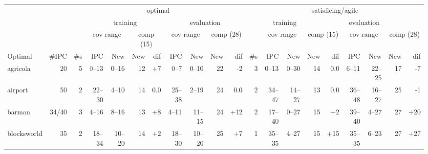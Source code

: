 \documentclass{article}
\begin{document}
                
                        \begin{table} \centering \scriptsize \setlength{\tabcolsep}{2pt}
                        \begin{tabular}{l@{}rr|rrrr|rrrr|r|rrrr|rrrr}
& & \multicolumn{9}{c}{optimal} & \multicolumn{9}{c}{satisficing/agile} \\
\cmidrule[\lightrulewidth](){3-11}
\cmidrule[\lightrulewidth](l){12-20}
& & & \multicolumn{4}{c}{training} & \multicolumn{4}{c}{evaluation} & \multicolumn{4}{c}{training} & \multicolumn{4}{c}{evaluation}\\
\cmidrule[\lightrulewidth](){4-7}
\cmidrule[\lightrulewidth](l){8-11}
\cmidrule[\lightrulewidth](){13-16}
\cmidrule[\lightrulewidth](l){17-20}
& & & \multicolumn{2}{c}{cov range} & \multicolumn{2}{c}{comp (15)} & \multicolumn{2}{c}{cov range} & \multicolumn{2}{c}{comp (28)} & & \multicolumn{2}{c}{cov range} & \multicolumn{2}{c}{comp (15)} & \multicolumn{2}{c}{cov range} & \multicolumn{2}{c}{comp (28)} \\
\cmidrule[\lightrulewidth](){4-5}
\cmidrule[\lightrulewidth](l){6-7}
\cmidrule[\lightrulewidth](l){8-9}
\cmidrule[\lightrulewidth](l){10-11}
\cmidrule[\lightrulewidth](){13-14}
\cmidrule[\lightrulewidth](l){15-16}
\cmidrule[\lightrulewidth](l){17-18}
      Optimal & \#IPC & \#s &     IPC &    New & New &              dif &     IPC &    New & New &               dif & \#s &      IPC &    New & New &               dif &      IPC &    New & New &               dif \\
\midrule
     agricola &    20 &   5 &   0--13 &  0--16 &  12 & {\color{blue}+7} &    0--7 &  0--10 &  22 &   {\color{red}-2} &   3 &    0--13 &  0--30 &  14 &               0.0 &    6--11 & 22--25 &  17 &   {\color{red}-7} \\
      airport &    50 &   2 &  22--30 &  4--10 &  14 &              0.0 &  25--38 &  2--19 &  24 &               0.0 &   2 &   34--47 & 14--27 &  13 &               0.0 &   36--48 & 16--27 &  25 &   {\color{red}-1} \\
       barman & 34/40 &   3 &   4--16 &  8--16 &  13 & {\color{blue}+8} &   4--11 & 11--15 &  24 & {\color{blue}+12} &   2 &   17--40 &  0--27 &  15 &  {\color{blue}+2} &   39--40 &  4--27 &  27 & {\color{blue}+20} \\
  blocksworld &    35 &   2 &  18--34 & 10--20 &  14 & {\color{blue}+2} &  18--30 & 10--20 &  25 &  {\color{blue}+7} &   1 &   35--35 &  4--27 &  15 & {\color{blue}+15} &   35--35 &  6--23 &  27 & {\color{blue}+27} \\

\end{tabular}
\end{table}
\end{document}
